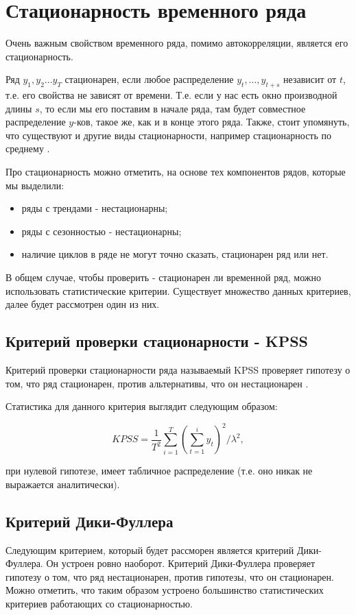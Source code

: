 \section{Стационарность временного ряда}
\label{sec:stationary}

Очень важным свойством временного ряда, помимо автокорреляции, является его стационарность.

Ряд $y_1, y_2 ... y_T$ стационарен, если любое распределение $y_t, ..., y_{t+s}$ независит от $t$, т.е. его свойства не зависят от времени. Т.е. если у нас есть окно производной длины $s$, то если мы его поставим в начале ряда, там будет совместное распределение $y$-ков, такое же, как и в конце этого ряда. Также, стоит упомянуть, что существуют и другие виды стационарности, например стационарность по среднему \cite{studopedia}.

Про стационарность можно отметить, на основе тех компонентов рядов, которые мы выделили:

\begin{itemize}
	\item ряды с трендами - нестационарны;
	\item ряды с сезонностью - нестационарны;
	\item наличие циклов в ряде не могут точно сказать, стационарен ряд или нет.
\end{itemize}

В общем случае, чтобы проверить - стационарен ли временной ряд, можно использовать статистические критерии. Существует множество данных критериев, далее будет рассмотрен один из них.

\subsection{Критерий проверки стационарности - KPSS}
\label{sec:stationary:kpss}

Критерий проверки стационарности ряда называемый KPSS проверяет гипотезу о том, что ряд стационарен, против альтернативы, что он нестационарен \cite{statsoft}.

Статистика для данного критерия выглядит следующим образом:

\begin{equation}
KPSS = \frac{1}{T^2}\sum_{i=1}^{T}{(\sum_{t=1}^i{y_t})^2/\lambda^2},
\end{equation}

при нулевой гипотезе, имеет табличное распределение (т.е. оно никак не выражается аналитически).

\subsection{Критерий Дики-Фуллера}
\label{sec:stationary:dicky-fuller}

Следующим критерием, который будет рассморен является критерий Дики-Фуллера. Он устроен ровно наоборот. Критерий Дики-Фуллера проверяет гипотезу о том, что ряд нестационарен, против гипотезы, что он стационарен. Можно отметить, что таким образом устроено большинство статистических критериев работающих со стационарностью.



